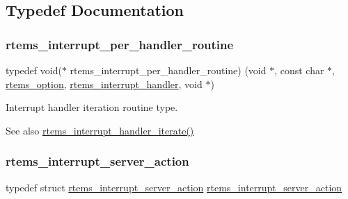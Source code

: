 \subsection{Typedef Documentation}
\mbox{\label{group__rtems__interrupt__extension_gad3e88a9acfac97a5021ff98471f5cd71}} 
\subsubsection{\texorpdfstring{rtems\_interrupt\_per\_handler\_routine}{rtems\_interrupt\_per\_handler\_routine}}
{\footnotesize\ttfamily typedef void($\ast$ rtems\+\_\+interrupt\+\_\+per\+\_\+handler\+\_\+routine) (void $\ast$, const char $\ast$, \mbox{\hyperlink{group__ClassicOptions_gad26685eb0e60a9650082935c31920e29}{rtems\+\_\+option}}, \mbox{\hyperlink{group__rtems__interrupt__extension_gab39bd096ab2c3b41d03dace0e9777b08}{rtems\+\_\+interrupt\+\_\+handler}}, void $\ast$)}



Interrupt handler iteration routine type. 

\begin{DoxySeeAlso}{See also}
\mbox{\hyperlink{group__rtems__interrupt__extension_ga31d23275b676018c06e13c7bedc87983}{rtems\+\_\+interrupt\+\_\+handler\+\_\+iterate()}} 
\end{DoxySeeAlso}
\mbox{\label{group__rtems__interrupt__extension_ga0349931ca47898d7b89ff3ee09dee2cc}} 
\subsubsection{\texorpdfstring{rtems\_interrupt\_server\_action}{rtems\_interrupt\_server\_action}}
{\footnotesize\ttfamily typedef struct \mbox{\hyperlink{structrtems__interrupt__server__action}{rtems\+\_\+interrupt\+\_\+server\+\_\+action}}  \mbox{\hyperlink{structrtems__interrupt__server__action}{rtems\+\_\+interrupt\+\_\+server\+\_\+action}}}



